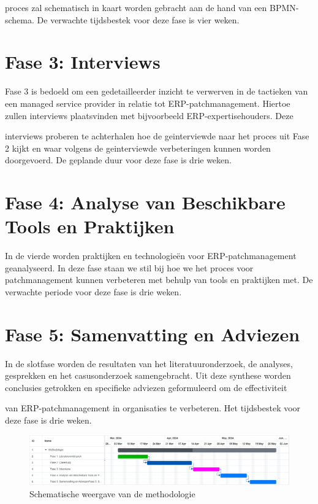 proces zal schematisch in kaart worden gebracht aan de hand van een BPMN-schema. De verwachte tijdsbestek voor deze fase is vier weken.
\section{Fase 3: Interviews}
Fase 3 is bedoeld om een gedetailleerder inzicht te verwerven in de tactieken van een managed service provider in relatie tot ERP-patchmanagement. Hiertoe zullen interviews plaatsvinden met bijvoorbeeld ERP-expertisehouders. Deze 

interviews proberen te achterhalen hoe de geinterviewde naar het proces uit Fase 2 kijkt en waar volgens de geinterviewde verbeteringen kunnen worden doorgevoerd. De geplande duur voor deze fase is drie weken.
\section{Fase 4: Analyse van Beschikbare Tools en Praktijken}
In de vierde worden praktijken en technologieën voor ERP-patchmanagement geanalyseerd. In deze fase staan we stil bij hoe we het proces voor patchmanagement kunnen verbeteren met behulp van tools en praktijken met. De verwachte periode voor deze fase is drie weken.
\section{Fase 5: Samenvatting en Adviezen}
In de slotfase worden de resultaten van het literatuuronderzoek, de analyses, gesprekken en het casusonderzoek samengebracht. Uit deze synthese worden conclusies getrokken en specifieke adviezen geformuleerd om de effectiviteit 

van ERP-patchmanagement in organisaties te verbeteren. Het tijdsbestek voor deze fase is drie weken. \\

\begin{figure}[htbp]
    \centering
    \includegraphics[width=\textwidth]{methodologie2.png}
    \caption{Schematische weergave van de methodologie}
     \label{fig:methodologie2}
\end{figure}